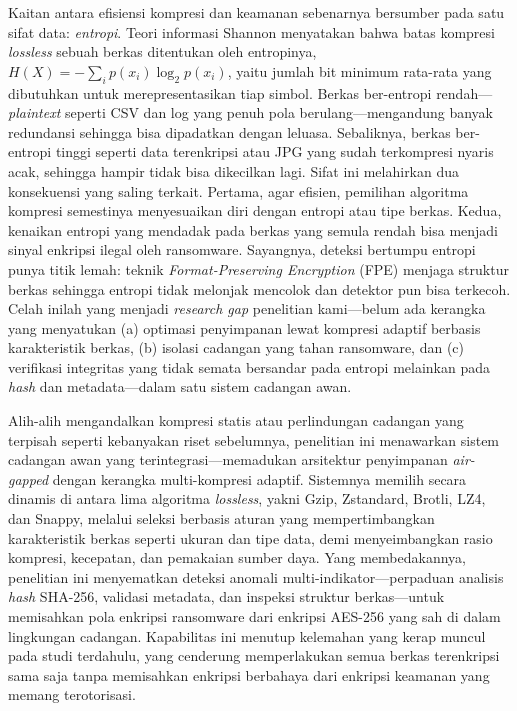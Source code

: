 \documentclass{iaesarticle}
\begin{document}
Kaitan antara efisiensi kompresi dan keamanan sebenarnya bersumber pada satu sifat data: \textit{entropi}. Teori informasi Shannon menyatakan bahwa batas kompresi \textit{lossless} sebuah berkas ditentukan oleh entropinya, $H(X) = -\sum_{i} p(x_i)\log_2 p(x_i)$, yaitu jumlah bit minimum rata-rata yang dibutuhkan untuk merepresentasikan tiap simbol. Berkas ber-entropi rendah---\textit{plaintext} seperti CSV dan log yang penuh pola berulang---mengandung banyak redundansi sehingga bisa dipadatkan dengan leluasa. Sebaliknya, berkas ber-entropi tinggi seperti data terenkripsi atau JPG yang sudah terkompresi nyaris acak, sehingga hampir tidak bisa dikecilkan lagi. Sifat ini melahirkan dua konsekuensi yang saling terkait. Pertama, agar efisien, pemilihan algoritma kompresi semestinya menyesuaikan diri dengan entropi atau tipe berkas. Kedua, kenaikan entropi yang mendadak pada berkas yang semula rendah bisa menjadi sinyal enkripsi ilegal oleh ransomware. Sayangnya, deteksi bertumpu entropi punya titik lemah: teknik \textit{Format-Preserving Encryption} (FPE) menjaga struktur berkas sehingga entropi tidak melonjak mencolok dan detektor pun bisa terkecoh. Celah inilah yang menjadi \textit{research gap} penelitian kami---belum ada kerangka yang menyatukan (a) optimasi penyimpanan lewat kompresi adaptif berbasis karakteristik berkas, (b) isolasi cadangan yang tahan ransomware, dan (c) verifikasi integritas yang tidak semata bersandar pada entropi melainkan pada \textit{hash} dan metadata---dalam satu sistem cadangan awan.

Alih-alih mengandalkan kompresi statis atau perlindungan cadangan yang terpisah seperti kebanyakan riset sebelumnya, penelitian ini menawarkan sistem cadangan awan yang terintegrasi---memadukan arsitektur penyimpanan \textit{air-gapped} dengan kerangka multi-kompresi adaptif. Sistemnya memilih secara dinamis di antara lima algoritma \textit{lossless}, yakni Gzip, Zstandard, Brotli, LZ4, dan Snappy, melalui seleksi berbasis aturan yang mempertimbangkan karakteristik berkas seperti ukuran dan tipe data, demi menyeimbangkan rasio kompresi, kecepatan, dan pemakaian sumber daya. Yang membedakannya, penelitian ini menyematkan deteksi anomali multi-indikator---perpaduan analisis \textit{hash} SHA-256, validasi metadata, dan inspeksi struktur berkas---untuk memisahkan pola enkripsi ransomware dari enkripsi AES-256 yang sah di dalam lingkungan cadangan. Kapabilitas ini menutup kelemahan yang kerap muncul pada studi terdahulu, yang cenderung memperlakukan semua berkas terenkripsi sama saja tanpa memisahkan enkripsi berbahaya dari enkripsi keamanan yang memang terotorisasi.
\end{document}
